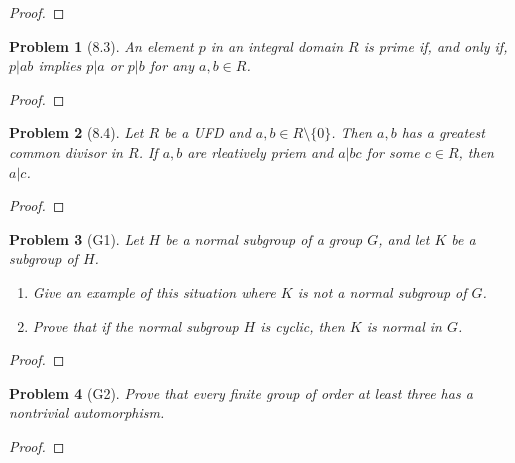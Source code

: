 \documentclass[10pt]{article}
\newcommand{\sk}{\vskip 10mm}
\theoremstyle{plain}
\newtheorem{problem}{Problem}
\theoremstyle{remark}
\begin{document}
\begin{proof}
  
\end{proof}

\sk

\begin{problem}[8.3]
  An element $p$ in an integral domain $R$ is prime if, and only if,
  $p|ab$ implies $p|a$ or $p|b$ for any $a,b\in R$.
\end{problem}

\begin{proof}
  
\end{proof}

\sk

\begin{problem}[8.4]
  Let $R$ be a UFD and $a,b\in R\setminus\{0\}$. Then $a,b$ has a greatest
  common divisor in $R$. If $a,b$ are rleatively priem and $a|bc$ for some
  $c\in R$, then $a|c$.
\end{problem}

\begin{proof}
  
\end{proof}

\sk

\begin{problem}[G1]
  Let $H$ be a normal subgroup of a group $G$, and let $K$ be a subgroup of $H$.
  \begin{enumerate}
  \item Give an example of this situation where $K$ is not a normal
    subgroup of $G$.
  \item Prove that if the normal subgroup $H$ is cyclic, then $K$ is normal
    in $G$.
  \end{enumerate}
\end{problem}

\begin{proof}
  
\end{proof}

\sk

\begin{problem}[G2]
  Prove that every finite group of order at least three has a nontrivial
  automorphism.
\end{problem}

\begin{proof}
  
\end{proof}

\sk
\end{document}
